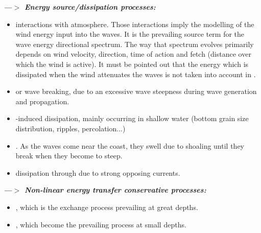  \textbf{\textit{---$>$ Energy source/dissipation processes:}}
\begin{itemize}
\item {} interactions with atmosphere. Those interactions imply the modelling of the wind energy input into the waves. It is the prevailing source term for the wave energy directional spectrum. The way that spectrum evolves primarily depends on wind velocity, direction, time of action and fetch (distance over which the wind is active). It must be pointed out that the energy which is dissipated when the wind attenuates the waves is not taken into account in \tomawac.

\item  {} or wave breaking, due to an excessive wave steepness during wave generation and propagation.

\item  {}-induced dissipation, mainly occurring in shallow water (bottom grain size distribution, ripples, percolation...)

\item  {}. As the waves come near the coast, they swell due to shoaling until they break when they become to steep.

\item  dissipation through  due to strong opposing currents.
\end{itemize}

 \textbf{\textit{---$>$ Non-linear energy transfer conservative processes:}}
\begin{itemize}

 \item {}, which is the exchange process prevailing at great depths.

\item  {}, which become the prevailing process at small depths.
\end{itemize}

